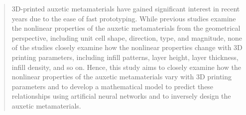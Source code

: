 \begin{abstract}

    3D-printed auxetic metamaterials have gained significant interest in recent years due to the ease of fast prototyping. While previous studies examine the nonlinear properties of the auxetic metamaterials from the geometrical perspective, including unit cell shape, direction, type, and magnitude, none of the studies closely examine how the nonlinear properties change with 3D printing parameters, including infill patterns, layer height, layer thickness, infill density, and so on. Hence, this study aims to closely examine how the nonlinear properties of the auxetic metamaterials vary with 3D printing parameters and to develop a mathematical model to predict these relationships using artificial neural networks and to inversely design the auxetic metamaterials.

\end{abstract}